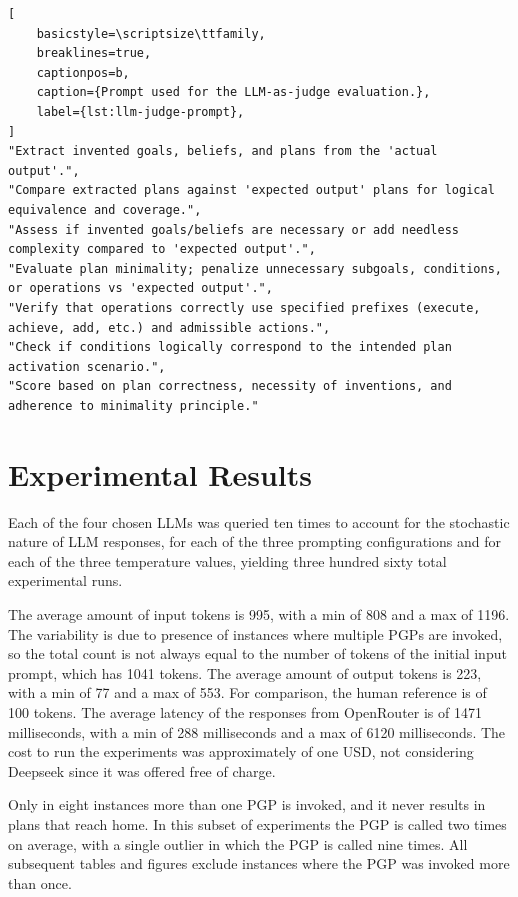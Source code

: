 \documentclass[12pt,a4paper,openright,twoside]{book}
\begin{document}
\begin{lstlisting}[
    basicstyle=\scriptsize\ttfamily,
    breaklines=true,
    captionpos=b,
    caption={Prompt used for the LLM-as-judge evaluation.},
    label={lst:llm-judge-prompt},
]
"Extract invented goals, beliefs, and plans from the 'actual output'.",
"Compare extracted plans against 'expected output' plans for logical equivalence and coverage.",
"Assess if invented goals/beliefs are necessary or add needless complexity compared to 'expected output'.",
"Evaluate plan minimality; penalize unnecessary subgoals, conditions, or operations vs 'expected output'.",
"Verify that operations correctly use specified prefixes (execute, achieve, add, etc.) and admissible actions.",
"Check if conditions logically correspond to the intended plan activation scenario.",
"Score based on plan correctness, necessity of inventions, and adherence to minimality principle."
\end{lstlisting}

\section{Experimental Results}\label{sec:exp-results}

Each of the four chosen \acp{LLM} was queried ten times to account for the stochastic nature of \ac{LLM} responses, for each of the three prompting configurations and for each of the three temperature values, yielding three hundred sixty total experimental runs.

The average amount of input tokens is 995, with a min of 808 and a max of 1196.
%
The variability is due to presence of instances where multiple \acp{PGP} are invoked, so the total count is not always equal to the number of tokens of the initial input prompt, which has 1041 tokens.
%
The average amount of output tokens is 223, with a min of 77 and a max of 553.
%
For comparison, the human reference is of 100 tokens.
%
The average latency of the responses from OpenRouter is of 1471 milliseconds, with a min of 288 milliseconds and a max of 6120 milliseconds.
%
The cost to run the experiments was approximately of one USD, not considering Deepseek since it was offered free of charge.

Only in eight instances more than one \ac{PGP} is invoked, and it never results in plans that reach home.
%
In this subset of experiments the \ac{PGP} is called two times on average, with a single outlier in which the \ac{PGP} is called nine times.
%
All subsequent tables and figures exclude instances where the \ac{PGP} was invoked more than once.
\end{document}
